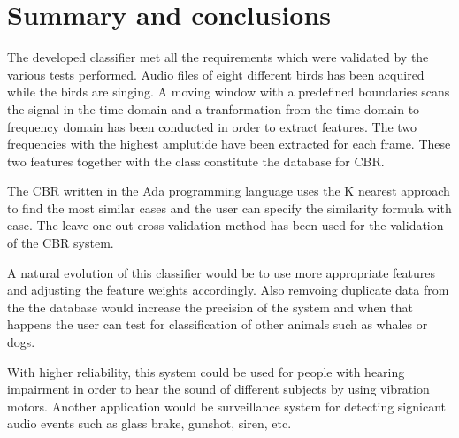 \section{Summary and conclusions}
The developed classifier met all the requirements which were validated
by the various tests performed. Audio files of eight different birds has been
acquired while the birds are singing. A moving window
with a predefined boundaries scans the signal in the time domain and a tranformation
from the time-domain to frequency domain has been conducted in order to extract features.
The two frequencies with the highest amplutide have been extracted for each frame.
These two features together with the class constitute the database for CBR.

The CBR written in the Ada programming language uses the K nearest approach to
find the most similar cases and the user can specify the similarity formula with ease.
The leave-one-out cross-validation method has been used for the validation of the CBR system.

A natural evolution of this classifier would be to use more appropriate features
and adjusting the feature weights accordingly. Also remvoing duplicate data from
the the database would increase the precision of the system and when that happens
the user can test for classification of other animals such as whales or dogs.

With higher reliability, this system could be used for people with hearing impairment
in order to hear the sound of different subjects by using vibration motors. Another application
would be surveillance system for detecting signicant
audio events such as glass brake, gunshot, siren, etc.
